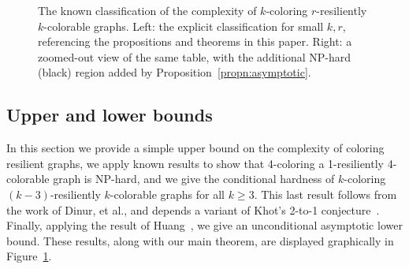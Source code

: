 \documentclass{article}[11pt]  %
\begin{document}
\begin{figure}
\centering
\begin{subfigure}{.65\textwidth}
  \centering
\end{subfigure}%
\begin{subfigure}{.35\textwidth}
  \centering
\end{subfigure}
\caption{The known classification of the complexity of $k$-coloring
$r$-resiliently $k$-colorable graphs. Left: the explicit classification for
small $k, r$, referencing the propositions and theorems in this paper. Right: a
zoomed-out view of the same table, with the additional NP-hard (black) region
added by Proposition~\ref{propn:asymptotic}.} 
\label{fig:classification} 
\end{figure}

\subsection{Upper and lower bounds} \label{sec:easy-bounds}
In this section we provide a simple upper bound on the complexity of coloring
resilient graphs, we apply known results to show that 4-coloring a
1-resiliently 4-colorable graph is NP-hard, and we give the conditional hardness
of $k$-coloring $(k-3)$-resiliently $k$-colorable graphs for all $k \geq 3$.
This last result follows from the work of Dinur, et al., and depends a variant
of Khot's 2-to-1 conjecture~\cite{DMR06}. Finally, applying the result of
Huang~\cite{Huang13}, we give an unconditional asymptotic lower bound. These
results, along with our main theorem, are displayed graphically in
Figure~\ref{fig:classification}.
\end{document}
